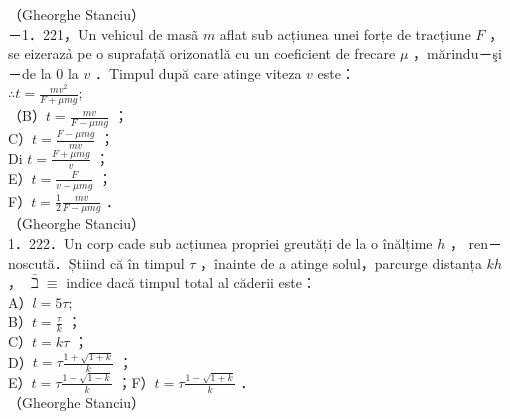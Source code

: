 \documentclass[10pt]{article}
\begin{document}
（Gheorghe Stanciu）\\
－1．221，Un vehicul de masã $m$ aflat sub acțiunea unei forțe de tracțiune $F$ ，se eizerazả pe o suprafață orizonatlă cu un coeficient de frecare $\mu$ ，mărindu－şi －de la 0 la $v$ ．Timpul după care atinge viteza $v$ este：\\
$\therefore t=\frac{m v^{2}}{F+\mu m g} ;$\\
（B）$t=\frac{m v}{F-\mu m g}$ ；\\
C）$t=\frac{F-\mu m g}{m v}$ ；\\
Di $t=\frac{F+\mu m g}{v}$ ；\\
E）$t=\frac{F}{v-\mu m g}$ ；\\
F）$t=\frac{1}{2} \frac{m v}{F-\mu m g}$ ．\\
（Gheorghe Stanciu）\\
1．222．Un corp cade sub acțiunea propriei greutăți de la o înălțime $h$ ， ren－noscută．Știind că în timpul $\tau$ ，înainte de a atinge solul，parcurge distanța $k h$ ， $\bar{\beth} \equiv$ indice dacă timpul total al căderii este：\\
A）$l=5 \tau ;$\\
B）$t=\frac{\tau}{k}$ ；\\
C）$t=k \tau$ ；\\
D）$t=\tau \frac{1+\sqrt{1+k}}{k}$ ；\\
E）$t=\tau \frac{1-\sqrt{1-k}}{k}$ ；F）$t=\tau \frac{1-\sqrt{1+k}}{k}$ ．\\
（Gheorghe Stanciu）
\end{document}
